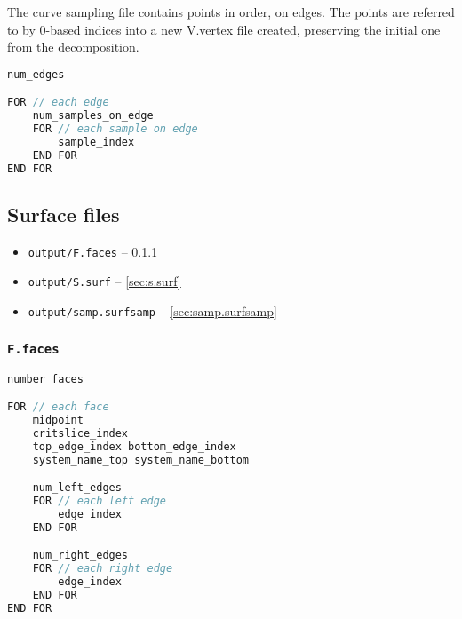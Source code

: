 The curve sampling file contains points in order, on edges.  The points are referred to by 0-based indices into a new V.vertex file created, preserving the initial one from the decomposition.

\begin{center}\begin{minipage}{0.9\linewidth}
\begin{lstlisting}[language=c++, caption={\tt output/samp.curvesamp}, captionpos=b]
num_edges

FOR // each edge
	num_samples_on_edge
	FOR // each sample on edge
		sample_index
	END FOR
END FOR
\end{lstlisting}
\end{minipage}\end{center}






\clearpage
\subsection{Surface files}
\label{sec:surface_files}


\begin{itemize}
	\item {\tt output/F.faces} -- \ref{sec:f.faces}
	\item {\tt output/S.surf} -- \ref{sec:s.surf}
	\item {\tt output/samp.surfsamp} -- \ref{sec:samp.surfsamp}
\end{itemize}

\subsubsection{\tt F.faces}
\label{sec:f.faces}
\begin{center}\begin{minipage}{0.9\linewidth}
\begin{lstlisting}[language=c++, caption={\tt output/F.faces}, captionpos=b]
number_faces

FOR // each face
	midpoint
	critslice_index
	top_edge_index bottom_edge_index
	system_name_top system_name_bottom

	num_left_edges
	FOR // each left edge
		edge_index
	END FOR

	num_right_edges
	FOR // each right edge
		edge_index
	END FOR
END FOR
\end{lstlisting}
\end{minipage}\end{center}

